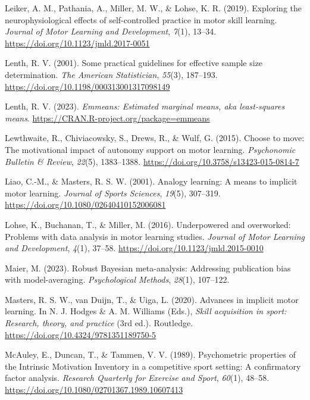 \documentclass[
  man, donotrepeattitle,mask,floatsintext]{apa7}
\newlength{\cslhangindent}
\newlength{\cslentryspacingunit} %
\newenvironment{CSLReferences}[2] %
 {%
  \setlength{\parindent}{0pt}
  \ifodd #1
  \let\oldpar\par
  \def\par{\hangindent=\cslhangindent\oldpar}
  \fi
  \setlength{\parskip}{#2\cslentryspacingunit}
 }%
 {}
\begin{document}
\begin{CSLReferences}{1}{0}
\leavevmode{}%
Leiker, A. M., Pathania, A., Miller, M. W., \& Lohse, K. R. (2019). Exploring the neurophysiological effects of self-controlled practice in motor skill learning. \emph{Journal of Motor Learning and Development}, \emph{7}(1), 13--34. \url{https://doi.org/10.1123/jmld.2017-0051}

\leavevmode{}%
Lenth, R. V. (2001). Some practical guidelines for effective sample size determination. \emph{The American Statistician}, \emph{55}(3), 187--193. \url{https://doi.org/10.1198/000313001317098149}

\leavevmode{}%
Lenth, R. V. (2023). \emph{Emmeans: Estimated marginal means, aka least-squares means}. \url{https://CRAN.R-project.org/package=emmeans}

\leavevmode{}%
Lewthwaite, R., Chiviacowsky, S., Drews, R., \& Wulf, G. (2015). Choose to move: {The} motivational impact of autonomy support on motor learning. \emph{Psychonomic Bulletin \& Review}, \emph{22}(5), 1383--1388. \url{https://doi.org/10.3758/s13423-015-0814-7}

\leavevmode{}%
Liao, C.-M., \& Masters, R. S. W. (2001). Analogy learning: {A} means to implicit motor learning. \emph{Journal of Sports Sciences}, \emph{19}(5), 307--319. \url{https://doi.org/10.1080/02640410152006081}

\leavevmode{}%
Lohse, K., Buchanan, T., \& Miller, M. (2016). Underpowered and overworked: {Problems} with data analysis in motor learning studies. \emph{Journal of Motor Learning and Development}, \emph{4}(1), 37--58. \url{https://doi.org/10.1123/jmld.2015-0010}

\leavevmode{}%
Maier, M. (2023). Robust {Bayesian} meta-analysis: {Addressing} publication bias with model-averaging. \emph{Psychological Methods}, \emph{28}(1), 107--122.

\leavevmode{}%
Masters, R. S. W., van Duijn, T., \& Uiga, L. (2020). Advances in implicit motor learning. In N. J. Hodges \& A. M. Williams (Eds.), \emph{Skill acquisition in sport: {Research}, theory, and practice} (3rd ed.). Routledge. \url{https://doi.org/10.4324/9781351189750-5}

\leavevmode{}%
McAuley, E., Duncan, T., \& Tammen, V. V. (1989). Psychometric properties of the {Intrinsic Motivation Inventory} in a competitive sport setting: {A} confirmatory factor analysis. \emph{Research Quarterly for Exercise and Sport}, \emph{60}(1), 48--58. \url{https://doi.org/10.1080/02701367.1989.10607413}


\end{CSLReferences}
\end{document}
